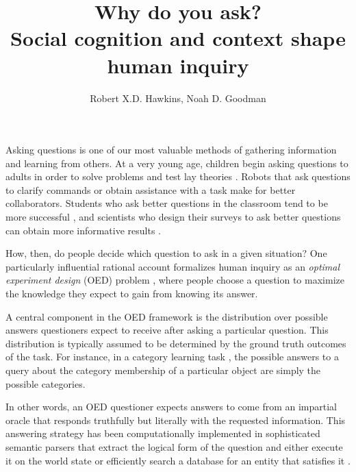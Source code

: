 \documentclass[11pt, floatsintext]{apa6}
\title{Why do you ask? \\ Social cognition and context shape human inquiry}
\author{Robert X.D. Hawkins, Noah D. Goodman}
\affiliation{Stanford University}
\begin{document}
\maketitle
Asking questions is one of our most valuable methods of gathering information and learning from others. 
At a very young age, children begin asking questions to adults in order to solve problems and test lay theories \cite{LegareEtAl13_QuestionsChildhood, Chouinard07_ChildrenQuestions,CallananOakes92_PreschoolerQuestions}. 
Robots that ask questions to clarify commands \cite{DeitsTellex___Roy13_HumanRobotDialog} or obtain assistance with a task \cite{FongThorpeBaur03_RobotQuestions} make for better collaborators. 
Students who ask better questions in the classroom tend to be more successful \cite{GraesserPerson94_QuestionAskingTutoring}, and scientists who design their surveys to ask better questions can obtain more informative results \cite{ClarkSchober92_InfluencingAnswers}.

How, then, do people decide which question to ask in a given situation?
One particularly influential rational account formalizes human inquiry as an \emph{optimal experiment design} (OED) problem \cite{OaksfordChater94_RationalAnalysisSelectionTask,Nelson05_UsefulQuestions,MyungPitt09_OED, GureckisMarkant12_SelfDirectedLearning,coenen2018asking}, where people choose a question to maximize the knowledge they expect to gain from knowing its answer. 

A central component in the OED framework is the distribution over possible answers questioners expect to receive after asking a particular question.
This distribution is typically assumed to be determined by the ground truth outcomes of the task. 
For instance, in a category learning task \cite{MarkantGureckis14_ActiveLearning}, the possible answers to a query about the category membership of a particular object are simply the possible categories.

In other words, an OED questioner expects answers to come from an impartial oracle that responds truthfully but literally with the requested information.
This answering strategy has been computationally implemented in sophisticated semantic parsers that extract the logical form of the question and either execute it on the world state \cite{rothe2017question} or efficiently search a database for an entity that satisfies it \cite{BerantChouFrostigLiang13_FreebaseQAPairs}. 
\end{document}
